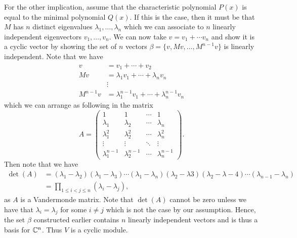 \documentclass[leqno]{article}
\begin{document}
\begin{solution}
For the other implication, assume that the characteristic polynomial $P(x)$ is equal to the minimal polynomial $Q(x)$.  If this is the case, then it must be that $M$ has $n$ distinct eigenvalues $\lambda_1,\dots,\lambda_n$ which we can associate to $n$ linearly independent eigenvectors $v_1,\dots,v_n$.  We can now take $v=v_1+\cdots v_n$ and show it is a cyclic vector by showing the set of $n$ vectors $\beta=\{v,Mv,\dots, M^{n-1}v\}$ is linearly independent.  Note that we have
\begin{align*}
v&= v_1 + \cdots + v_2\\
Mv&= \lambda_1 v_1 + \cdots + \lambda_n v_n\\
&\vdots \\
M^{n-1}v&= \lambda_1^{n-1} v_1 + \cdots + \lambda_n^{n-1} v_n
\end{align*}
which we can arrange as following in the matrix
\[
A = \begin{pmatrix} 1 & 1 &\cdots & 1 \\ \lambda_1 & \lambda_2 & \cdots & \lambda_n\\
\lambda_1^2 & \lambda_2^2 & \cdots & \lambda_n^2\\
\vdots & \vdots & \ddots & \vdots \\
\lambda_1^{n-1} & \lambda_2^{n-1} & \cdots & \lambda_n^{n-1}\end{pmatrix}.
\]
Then note that we have
\begin{align*}
\det(A) &= (\lambda_1-\lambda_2)(\lambda_1-\lambda_3)\cdots(\lambda_1-\lambda_n)(\lambda_2-\lambda3)(\lambda_2-\lambda-4)\cdots (\lambda_{n-1}-\lambda_n)\\
&= \prod_{1\leq i < j \leq n} (\lambda_i - \lambda_j),
\end{align*}
as $A$ is a Vandermonde matrix.  Note that $\det(A)$ cannot be zero unless we have that $\lambda_i=\lambda_j$ for some $i\neq j$ which is not the case by our assumption.  Hence, the set $\beta$ constructed earlier contains $n$ linearly independent vectors and is thus a basis for $\mathbb{C}^n$.  Thus $V$ is a cyclic module.



\end{solution}
\end{document}
